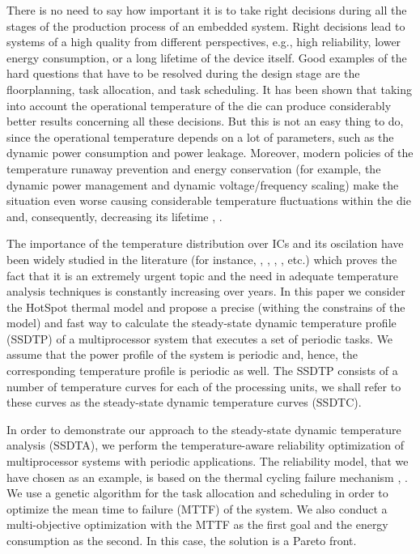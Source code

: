 There is no need to say how important it is to take right decisions during all the stages of the production process of an embedded system. Right decisions lead to systems of a high quality from different perspectives, e.g., high reliability, lower energy consumption, or a long lifetime of the device itself. Good examples of the hard questions that have to be resolved during the design stage are the floorplanning, task allocation, and task scheduling. It has been shown that taking into account the operational temperature of the die can produce considerably better results concerning all these decisions. But this is not an easy thing to do, since the operational temperature depends on a lot of parameters, such as the dynamic power consumption and power leakage. Moreover, modern policies of the temperature runaway prevention and energy conservation (for example, the dynamic power management and dynamic voltage/frequency scaling) make the situation even worse causing considerable temperature fluctuations within the die and, consequently, decreasing its lifetime \cite{mihic2004}, \cite{simunic2005}.

The importance of the temperature distribution over ICs and its oscilation have been widely studied in the literature (for instance, \cite{hieu2004}, \cite{lu2004}, \cite{jedec2010}, \cite{xiang2010}, etc.) which proves the fact that it is an extremely urgent topic and the need in adequate temperature analysis techniques is constantly increasing over years. In this paper we consider the HotSpot thermal model \cite{huang2006} and propose a precise (withing the constrains of the model) and fast way to calculate the steady-state dynamic temperature profile (SSDTP) of a multiprocessor system that executes a set of periodic tasks. We assume that the power profile of the system is periodic and, hence, the corresponding temperature profile is periodic as well. The SSDTP consists of a number of temperature curves for each of the processing units, we shall refer to these curves as the steady-state dynamic temperature curves (SSDTC).

In order to demonstrate our approach to the steady-state dynamic temperature analysis (SSDTA), we perform the temperature-aware reliability optimization of multiprocessor systems with periodic applications. The reliability model, that we have chosen as an example, is based on the thermal cycling failure mechanism \cite{xiang2010}, \cite{huang2009}. We use a genetic algorithm \cite{schmitz2004} for the task allocation and scheduling in order to optimize the mean time to failure (MTTF) of the system. We also conduct a multi-objective optimization with the MTTF as the first goal and the energy consumption as the second. In this case, the solution is a Pareto front.
